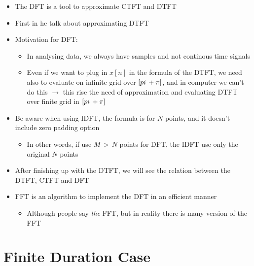 \documentclass[12pt,a4paper]{book}
\begin{document}
\begin{itemize}
    \item The DFT is a tool to approximate CTFT and DTFT
    
    \item First in \cite{DSP_Proakis} he talk about approximating DTFT
    
    \item Motivation for DFT:
    
        \begin{itemize}
            \item In analysing data, we always have samples and not continous time signals
            
            \item Even if we want to plug in $x[n]$ in the formula of the DTFT, we need also to evaluate on infinite grid over $[\-pi \, + \pi]$, and in computer we can't do this $\rightarrow$ this rise the need of approximation and evaluating DTFT over finite grid in $[\-pi \, + \pi]$
        \end{itemize}
    
    
    \item Be aware when using IDFT, the formula is for $N$ points, and it doesn't include zero padding option
    
        \begin{itemize}
            \item In other words, if use $M \, > \, N$ points for DFT, the IDFT use only the original $N$ points
        \end{itemize}
    
    
    \item After finishing up with the DTFT, we will see the relation between the DTFT, CTFT and DFT
    
    
    \item FFT is an algorithm to implement the DFT in an efficient manner
    
        \begin{itemize}
            \item Although people say \textit{the} FFT, but in reality there is many version of the FFT
        \end{itemize}
    
\end{itemize}


\section{Finite Duration Case}
\end{document}
